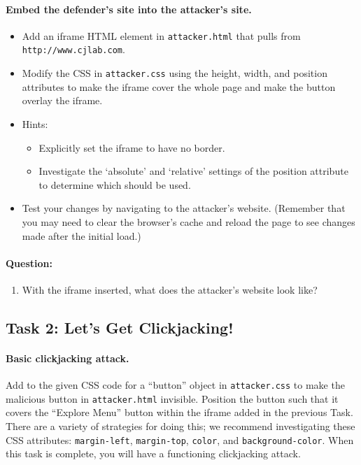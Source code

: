\paragraph{Embed the defender's site into the attacker's site.}
\begin{itemize}
    \item Add an iframe HTML element in \texttt{attacker.html} that 
    pulls from \texttt{http://www.cjlab.com}. 
    \item Modify the CSS in \texttt{attacker.css} using the height,
    width, and position attributes to make the iframe cover the whole 
    page and make the button overlay the iframe.
    
    \item Hints:
    \begin{itemize}
       \item Explicitly set the iframe to have no border.
       \item Investigate the `absolute' and `relative' settings of the 
       position attribute to determine which should be used.
    \end{itemize} 

    \item Test your changes by navigating to the attacker's website.
          (Remember that you may need to clear the browser's cache and
          reload the page to see changes made after the initial load.)

\end{itemize} 

\paragraph{Question:}
\begin{enumerate}
    \item With the iframe inserted, what does the attacker's website
    look like?
\end{enumerate}


\subsection{Task 2: Let’s Get Clickjacking!}

\paragraph{Basic clickjacking attack.}
Add to the given CSS code for a ``button'' object in
\texttt{attacker.css} to make the malicious button in
\texttt{attacker.html} invisible. Position the button such that it
covers the ``Explore Menu'' button within the iframe added in the
previous Task. There are a variety of strategies for doing this; we
recommend investigating these CSS attributes: \texttt{margin-left},
\texttt{margin-top}, \texttt{color}, and \texttt{background-color}. When
this task is complete, you will have a functioning clickjacking attack. 

